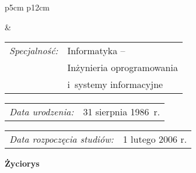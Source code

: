 \begin{titlepage}
    \newpage\thispagestyle{empty}
    \begin{tabular}{p{5cm} p{12cm}}
    \begin{minipage}{5cm}
    \center
    \end{minipage}
    &
    \begin{minipage}{12cm}
    \begin{flushleft}
    \par\noindent\vspace{1\baselineskip}
    \begin{tabular}[h]{l l}
    {\normalsize\it Specjalność:} & Informatyka -- \\
    & Inżynieria oprogramowania \\
    & i~systemy informacyjne
    \end{tabular}
    \par\noindent\vspace{1\baselineskip}
    \begin{tabular}[h]{l l}
    {\normalsize\it Data urodzenia:} & {\normalsize 31 sierpnia 1986~r.}
    \end{tabular}
    \par\noindent\vspace{1\baselineskip}
    \begin{tabular}[h]{l l}
    {\normalsize\it Data rozpoczęcia studiów:} & {\normalsize 1 lutego 2006 r.}
    \end{tabular}
    \par\noindent\vspace{1\baselineskip}
    \end{flushleft}
    \end{minipage}
    \end{tabular}
    \vspace*{1\baselineskip}
    \begin{center}
	{\large\bfseries Życiorys}\par\bigskip
    \end{center}


\end{titlepage}
